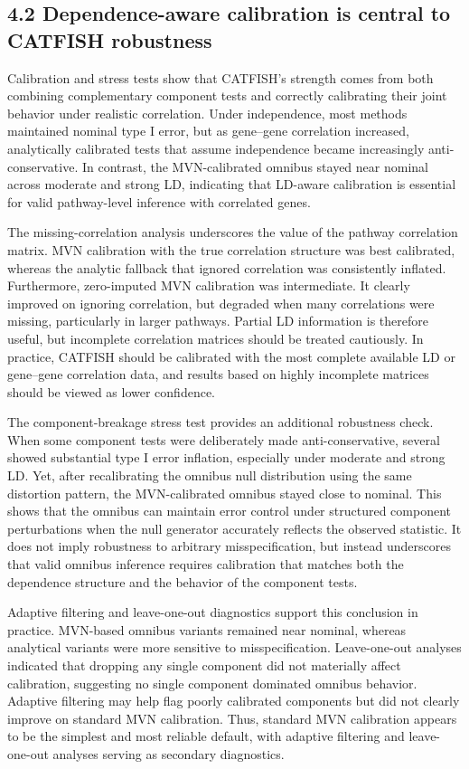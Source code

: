 \documentclass[unnumsec,webpdf,contemporary,large]{oup-authoring-template}%
\theoremstyle{thmstyleone}%
\theoremstyle{thmstyletwo}%
\theoremstyle{thmstylethree}%
\begin{document}
\subsection*{4.2 Dependence-aware calibration is central to CATFISH robustness}

Calibration and stress tests show that CATFISH’s strength comes from both combining complementary component tests and correctly calibrating their joint behavior under realistic correlation. Under independence, most methods maintained nominal type I error, but as gene–gene correlation increased, analytically calibrated tests that assume independence became increasingly anti-conservative. In contrast, the MVN-calibrated omnibus stayed near nominal across moderate and strong LD, indicating that LD-aware calibration is essential for valid pathway-level inference with correlated genes.

The missing-correlation analysis underscores the value of the pathway correlation matrix. MVN calibration with the true correlation structure was best calibrated, whereas the analytic fallback that ignored correlation was consistently inflated. Furthermore, zero-imputed MVN calibration was intermediate. It clearly improved on ignoring correlation, but degraded when many correlations were missing, particularly in larger pathways. Partial LD information is therefore useful, but incomplete correlation matrices should be treated cautiously. In practice, CATFISH should be calibrated with the most complete available LD or gene–gene correlation data, and results based on highly incomplete matrices should be viewed as lower confidence.

The component-breakage stress test provides an additional robustness check. When some component tests were deliberately made anti-conservative, several showed substantial type I error inflation, especially under moderate and strong LD. Yet, after recalibrating the omnibus null distribution using the same distortion pattern, the MVN-calibrated omnibus stayed close to nominal. This shows that the omnibus can maintain error control under structured component perturbations when the null generator accurately reflects the observed statistic. It does not imply robustness to arbitrary misspecification, but instead underscores that valid omnibus inference requires calibration that matches both the dependence structure and the behavior of the component tests.

Adaptive filtering and leave-one-out diagnostics support this conclusion in practice. MVN-based omnibus variants remained near nominal, whereas analytical variants were more sensitive to misspecification. Leave-one-out analyses indicated that dropping any single component did not materially affect calibration, suggesting no single component dominated omnibus behavior. Adaptive filtering may help flag poorly calibrated components but did not clearly improve on standard MVN calibration. Thus, standard MVN calibration appears to be the simplest and most reliable default, with adaptive filtering and leave-one-out analyses serving as secondary diagnostics.
\end{document}
